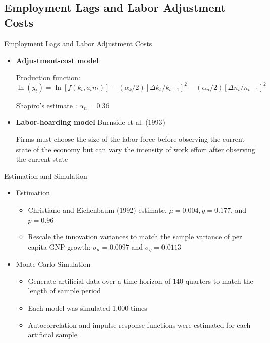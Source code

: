 \documentclass[10pt]{beamer}
\begin{document}
\subsection{Employment Lags and Labor Adjustment Costs}
\begin{frame}{Employment Lags and Labor Adjustment Costs}
    \begin{itemize}
        \item \textbf{Adjustment-cost model}

              Production function: $$ \ln \left(y_t\right)= \ln \left[f\left(k_t, a_t
                      n_t\right)\right] -\left(\alpha_{k} / 2\right)\left[\Delta k_t /
                      k_{t-1}\right]^2 -\left(\alpha_n / 2\right)\left[\Delta n_t / n_{t-1}\right]^2
              $$

              Shapiro's estimate : $\alpha_{n} = 0.36$

        \item \textbf{Labor-hoarding model} Burnside et al. (1993)

              Firms must choose the size of the labor force before observing the current
              state of the economy but can vary the intensity of work effort after observing
              the current state
    \end{itemize}

\end{frame}

\begin{frame}{Estimation and Simulation}
    \begin{itemize}
        \item Estimation
              \begin{itemize}
                  \item Christiano and Eichenbaum (1992) estimate, $\mu = 0.004, \bar{g} = 0.177$, and
                        $p = 0.96$
                  \item Rescale the innovation variances to match the sample variance of per capita GNP
                        growth: $\sigma_a = 0.0097$ and $\sigma_g = 0.0113$
              \end{itemize}
        \item Monte Carlo Simulation
              \begin{itemize}
                  \item Generate artificial data over a time horizon of 140 quarters to match the
                        length of sample period
                  \item Each model was simulated 1,000 times
                  \item Autocorrelation and impulse-response functions were estimated for each
                        artificial sample
              \end{itemize}

    \end{itemize}
\end{frame}
\end{document}
